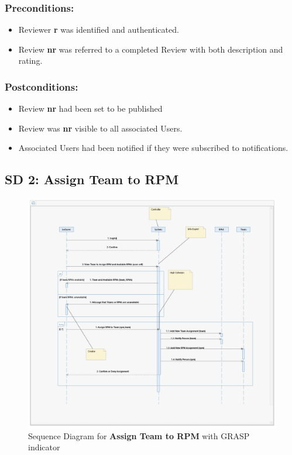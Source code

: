 \subsubsection*{Preconditions:}
\begin{itemize}
\itemsep-1em 
    \item Reviewer \textbf{r} was identified and authenticated.
    \item Review \textbf{nr} was referred to a completed Review with both description and rating.
\end{itemize}



\subsubsection*{Postconditions:}
\begin{itemize}
\itemsep-1em 
    \item Review \textbf{nr} had been set to be published
    \item Review was \textbf{nr} visible to all associated Users.
    \item Associated Users had been notified if they were subscribed to notifications.
\end{itemize}






\newpage




\subsection*{SD 2: Assign Team to RPM}



\begin{figure}[h]
\includegraphics[width=14cm]{SD_AssignTeamToRPM.jpeg}
\centering
\caption{Sequence Diagram for \textbf{Assign Team to RPM} with GRASP indicator}
\end{figure}

